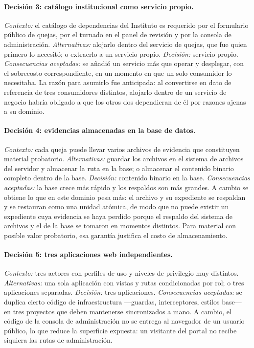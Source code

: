 	\paragraph{Decisión 3: catálogo institucional como servicio propio.}
	\emph{Contexto:} el catálogo de dependencias del Instituto es requerido por el formulario público
	de quejas, por el turnado en el panel de revisión y por la consola de administración.
	\emph{Alternativas:} alojarlo dentro del servicio de quejas, que fue quien primero lo necesitó;
	o extraerlo a un servicio propio. \emph{Decisión:} servicio propio.
	\emph{Consecuencias aceptadas:} se añadió un servicio más que operar y desplegar, con el
	sobrecosto correspondiente, en un momento en que un solo consumidor lo necesitaba. La razón para
	asumirlo fue anticipada: al convertirse en dato de referencia de tres consumidores distintos,
	alojarlo dentro de un servicio de negocio habría obligado a que los otros dos dependieran de él
	por razones ajenas a su dominio.
	
	\paragraph{Decisión 4: evidencias almacenadas en la base de datos.}
	\emph{Contexto:} cada queja puede llevar varios archivos de evidencia que constituyen material
	probatorio. \emph{Alternativas:} guardar los archivos en el sistema de archivos del servidor y
	almacenar la ruta en la base; o almacenar el contenido binario completo dentro de la base.
	\emph{Decisión:} contenido binario en la base. \emph{Consecuencias aceptadas:} la base crece más
	rápido y los respaldos son más grandes. A cambio se obtiene lo que en este dominio pesa más: el
	archivo y su expediente se respaldan y se restauran como una unidad atómica, de modo que no puede
	existir un expediente cuya evidencia se haya perdido porque el respaldo del sistema de archivos y
	el de la base se tomaron en momentos distintos. Para material con posible valor probatorio, esa
	garantía justifica el costo de almacenamiento.
	
	\paragraph{Decisión 5: tres aplicaciones web independientes.}
	\emph{Contexto:} tres actores con perfiles de uso y niveles de privilegio muy distintos.
	\emph{Alternativas:} una sola aplicación con vistas y rutas condicionadas por rol; o tres
	aplicaciones separadas. \emph{Decisión:} tres aplicaciones. \emph{Consecuencias aceptadas:} se
	duplica cierto código de infraestructura ---guardas, interceptores, estilos base--- en tres
	proyectos que deben mantenerse sincronizados a mano. A cambio, el código de la consola de
	administración no se entrega al navegador de un usuario público, lo que reduce la superficie
	expuesta: un visitante del portal no recibe siquiera las rutas de administración.
	
